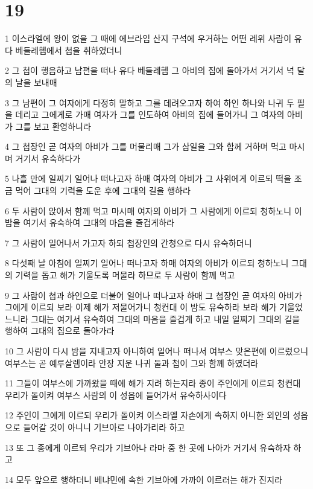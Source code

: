 \chapter{19}

\par 1 이스라엘에 왕이 없을 그 때에 에브라임 산지 구석에 우거하는 어떤 레위 사람이 유다 베들레헴에서 첩을 취하였더니
\par 2 그 첩이 행음하고 남편을 떠나 유다 베들레헴 그 아비의 집에 돌아가서 거기서 넉 달의 날을 보내매
\par 3 그 남편이 그 여자에게 다정히 말하고 그를 데려오고자 하여 하인 하나와 나귀 두 필을 데리고 그에게로 가매 여자가 그를 인도하여 아비의 집에 들어가니 그 여자의 아비가 그를 보고 환영하니라
\par 4 그 첩장인 곧 여자의 아비가 그를 머물리매 그가 삼일을 그와 함께 거하며 먹고 마시며 거기서 유숙하다가
\par 5 나흘 만에 일찌기 일어나 떠나고자 하매 여자의 아비가 그 사위에게 이르되 떡을 조금 먹어 그대의 기력을 도운 후에 그대의 길을 행하라
\par 6 두 사람이 앉아서 함께 먹고 마시매 여자의 아비가 그 사람에게 이르되 청하노니 이 밤을 여기서 유숙하여 그대의 마음을 즐겁게하라
\par 7 그 사람이 일어나서 가고자 하되 첩장인의 간청으로 다시 유숙하더니
\par 8 다섯째 날 아침에 일찌기 일어나 떠나고자 하매 여자의 아비가 이르되 청하노니 그대의 기력을 돕고 해가 기울도록 머물라 하므로 두 사람이 함께 먹고
\par 9 그 사람이 첩과 하인으로 더불어 일어나 떠나고자 하매 그 첩장인 곧 여자의 아비가 그에게 이르되 보라 이제 해가 저물어가니 청컨대 이 밤도 유숙하라 보라 해가 기울었느니라 그대는 여기서 유숙하여 그대의 마음을 즐겁게 하고 내일 일찌기 그대의 길을 행하여 그대의 집으로 돌아가라
\par 10 그 사람이 다시 밤을 지내고자 아니하여 일어나 떠나서 여부스 맞은편에 이르렀으니 여부스는 곧 예루살렘이라 안장 지운 나귀 둘과 첩이 그와 함께 하였더라
\par 11 그들이 여부스에 가까왔을 때에 해가 지려 하는지라 종이 주인에게 이르되 청컨대 우리가 돌이켜 여부스 사람의 이 성읍에 들어가서 유숙하사이다
\par 12 주인이 그에게 이르되 우리가 돌이켜 이스라엘 자손에게 속하지 아니한 외인의 성읍으로 들어갈 것이 아니니 기브아로 나아가리라 하고
\par 13 또 그 종에게 이르되 우리가 기브아나 라마 중 한 곳에 나아가 거기서 유숙하자 하고
\par 14 모두 앞으로 행하더니 베냐민에 속한 기브아에 가까이 이르러는 해가 진지라
